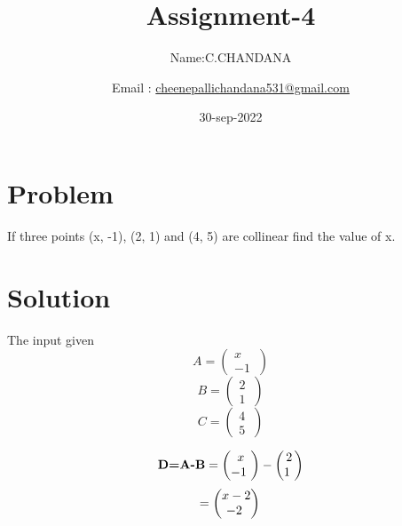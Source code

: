 \documentclass[10pt, a4paper]{article}
\begin{document}
\title{Assignment-4}
\author{Name:C.CHANDANA\and Email :  \url{cheenepallichandana531@gmail.com}}
\date{30-sep-2022}
\maketitle



\section{Problem}
If three points (x, -1), (2, 1) and (4, 5) are collinear find the value of x.\\
\section{Solution}
\begin{center}
The input given 
\boldmath
\begin{equation} \label{eq:}
A=\begin{pmatrix} x\\ -1\ \end{pmatrix} 
\end{equation}
\begin{equation}\label{eq:}
B=\begin{pmatrix} 2\\ 1\ \end{pmatrix}
\end{equation}
\begin{equation}\label{eq:}
C=\begin{pmatrix} 4\\ 5\ \end{pmatrix}
\end{equation}
\unboldmath
\end{center}
\begin{equation}\label{eq:}
\textbf{D=A-B}\\
=\begin{pmatrix} x\\ -1\ \end{pmatrix}- \begin{pmatrix} 2\\ 1\ \end{pmatrix}
\end{equation}
\begin{equation}\label{eq:}
=\begin{pmatrix} x-2\\ -2\ \end{pmatrix}\\
\end{equation}
\end{document}

